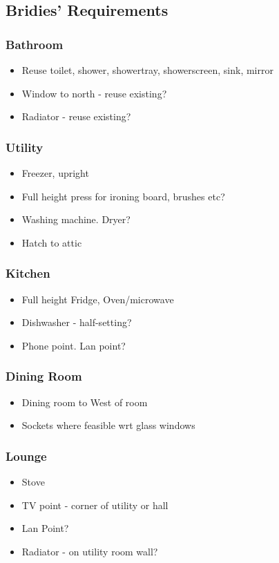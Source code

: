 \subsection{Bridies' Requirements}
\subsubsection{Bathroom}
\begin{itemize}
\item Reuse toilet, shower, showertray, showerscreen, sink, mirror
\item Window  to north - reuse existing?
\item Radiator - reuse existing?    
\end{itemize}

\subsubsection{Utility}
\begin{itemize}
\item Freezer, upright
\item Full height  press for ironing board, brushes etc?
\item Washing machine. Dryer?
\item Hatch to attic
\end{itemize}

\subsubsection{Kitchen}
\begin{itemize}
\item Full height Fridge, Oven/microwave
\item Dishwasher - half-setting?
\item Phone point. Lan point?    
\end{itemize}

\subsubsection{Dining Room}
\begin{itemize}
\item Dining room to West of room
\item Sockets where feasible wrt glass windows
\end{itemize}

\subsubsection{Lounge}
\begin{itemize}
\item Stove
\item TV point - corner of utility or hall
\item Lan Point?  
\item Radiator - on utility room wall?
\end{itemize}




